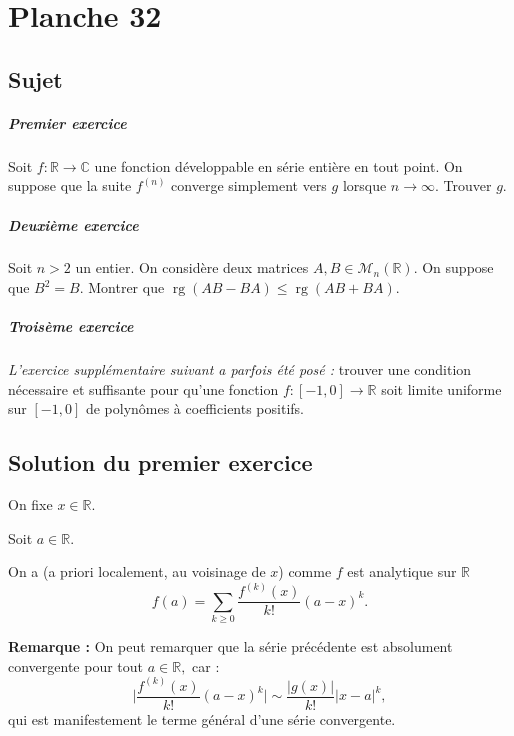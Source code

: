 \chapter{Planche 32}

\section{Sujet}

\paragraph{Premier exercice}
Soit $f : \mathbb{R} \rightarrow  \mathbb{C}$ une fonction développable en série entière en tout point. On suppose que la suite $f^{(n)}$ converge simplement vers $g$ lorsque $n\rightarrow \infty $. Trouver $g$.

\paragraph{Deuxième exercice}
Soit $n > 2$ un entier. On considère deux matrices $A, B \in  \mathcal{M} _{n} (\mathbb{R})$. On suppose que $B^2  = B$. Montrer que $\operatorname{rg}(AB -BA) \leqslant  \operatorname{rg}(AB + BA)$.

\paragraph{Troisème exercice}
\emph{L’exercice supplémentaire suivant a parfois été posé :} trouver une condition nécessaire et suffisante pour qu'une fonction $f : [-1, 0] \rightarrow  \mathbb{R}$ soit limite uniforme sur $[-1, 0]$ de polynômes à coefficients positifs.

\section{Solution du premier exercice}

On fixe $x\in \mathbb{R}.$

Soit $a\in \mathbb{R}.$

On a (a priori localement, au voisinage de $x$) comme $f$ est analytique sur $\mathbb{R}$
$$f(a)=\sum_{k\geq 0}\frac{f^{(k)}(x)}{k!}(a-x)^{k}.$$

\textbf{Remarque :} On peut remarquer que la série précédente est absolument convergente pour tout $a\in \mathbb{R},$ car : $$\vert \frac{f^{(k)}(x)}{k!}(a-x)^{k}\vert \sim \frac{\vert g(x) \vert }{k!}\vert x-a\vert^{k},$$ qui est manifestement le terme général d'une série convergente. 

